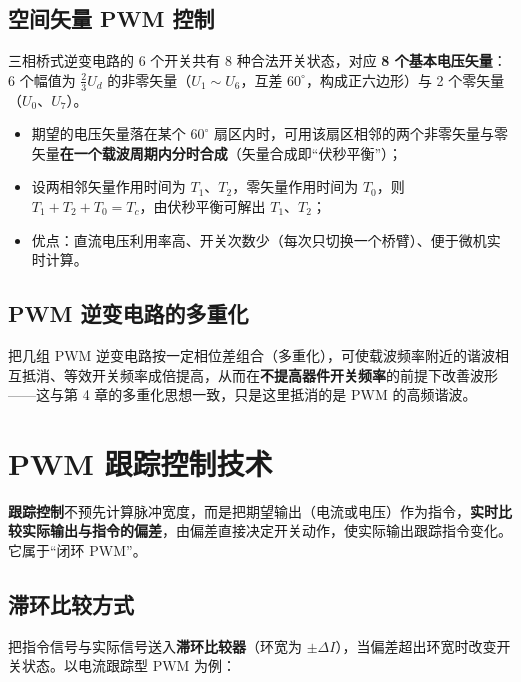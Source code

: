 
\subsection{空间矢量 PWM 控制}

三相桥式逆变电路的 6 个开关共有 8 种合法开关状态，对应 \textbf{8 个基本电压矢量}：6 个幅值为 $\frac{2}{3}U_d$ 的非零矢量（$U_1\sim U_6$，互差 $60^\circ$，构成正六边形）与 2 个零矢量（$U_0$、$U_7$）。

\begin{itemize}
  \item 期望的电压矢量落在某个 $60^\circ$ 扇区内时，可用该扇区相邻的两个非零矢量与零矢量\textbf{在一个载波周期内分时合成}（矢量合成即“伏秒平衡”）；
  \item 设两相邻矢量作用时间为 $T_1$、$T_2$，零矢量作用时间为 $T_0$，则 $T_1+T_2+T_0=T_c$，由伏秒平衡可解出 $T_1$、$T_2$；
  \item 优点：直流电压利用率高、开关次数少（每次只切换一个桥臂）、便于微机实时计算。
\end{itemize}

\subsection{PWM 逆变电路的多重化}

把几组 PWM 逆变电路按一定相位差组合（多重化），可使载波频率附近的谐波相互抵消、等效开关频率成倍提高，从而在\textbf{不提高器件开关频率}的前提下改善波形——这与第 4 章的多重化思想一致，只是这里抵消的是 PWM 的高频谐波。

\section{PWM 跟踪控制技术}

\textbf{跟踪控制}不预先计算脉冲宽度，而是把期望输出（电流或电压）作为指令，\textbf{实时比较实际输出与指令的偏差}，由偏差直接决定开关动作，使实际输出跟踪指令变化。它属于“闭环 PWM”。

\subsection{滞环比较方式}

把指令信号与实际信号送入\textbf{滞环比较器}（环宽为 $\pm\Delta I$），当偏差超出环宽时改变开关状态。以电流跟踪型 PWM 为例：

